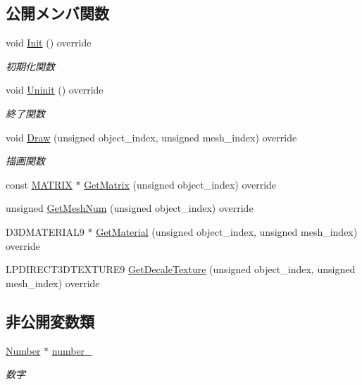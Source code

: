 \subsection*{公開メンバ関数}
\begin{DoxyCompactItemize}
\item 
void \mbox{\hyperlink{class_number_draw_ad52c1e8b9ae6e830a82c440cc18cb6c9}{Init}} () override
\begin{DoxyCompactList}\small\item\em 初期化関数 \end{DoxyCompactList}\item 
void \mbox{\hyperlink{class_number_draw_a2b203d101f23f0d3f584937ff5ad662a}{Uninit}} () override
\begin{DoxyCompactList}\small\item\em 終了関数 \end{DoxyCompactList}\item 
void \mbox{\hyperlink{class_number_draw_a15e4e602b3f9372349d0b6ff9e4fc423}{Draw}} (unsigned object\+\_\+index, unsigned mesh\+\_\+index) override
\begin{DoxyCompactList}\small\item\em 描画関数 \end{DoxyCompactList}\item 
const \mbox{\hyperlink{_vector3_d_8h_a032295cd9fb1b711757c90667278e744}{M\+A\+T\+R\+IX}} $\ast$ \mbox{\hyperlink{class_number_draw_a78f50afa05e728811d89a491f5eec899}{Get\+Matrix}} (unsigned object\+\_\+index) override
\item 
unsigned \mbox{\hyperlink{class_number_draw_a8234fb06d885feaa8a2f0ecf256db9a0}{Get\+Mesh\+Num}} (unsigned object\+\_\+index) override
\item 
D3\+D\+M\+A\+T\+E\+R\+I\+A\+L9 $\ast$ \mbox{\hyperlink{class_number_draw_a3348d9d1cdd9dd03be25b82069275ca5}{Get\+Material}} (unsigned object\+\_\+index, unsigned mesh\+\_\+index) override
\item 
L\+P\+D\+I\+R\+E\+C\+T3\+D\+T\+E\+X\+T\+U\+R\+E9 \mbox{\hyperlink{class_number_draw_ad1d9a4cee49e7bddce51b5c58e739de9}{Get\+Decale\+Texture}} (unsigned object\+\_\+index, unsigned mesh\+\_\+index) override
\end{DoxyCompactItemize}
\subsection*{非公開変数類}
\begin{DoxyCompactItemize}
\item 
\mbox{\hyperlink{class_number}{Number}} $\ast$ \mbox{\hyperlink{class_number_draw_a8063f58804542a7f86b341eec4cc1e60}{number\+\_\+}}
\begin{DoxyCompactList}\small\item\em 数字 \end{DoxyCompactList}\end{DoxyCompactItemize}


